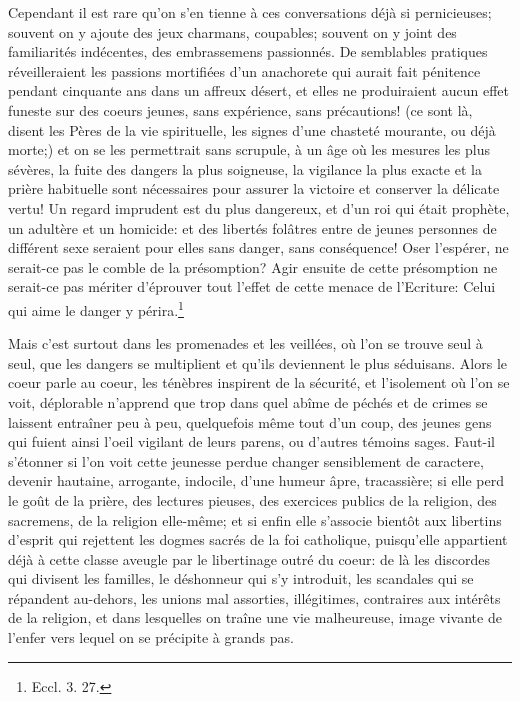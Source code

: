 \documentclass[instructions.tex]{subfiles}
\begin{document}
\secundo Cependant il est rare qu’on s’en tienne à ces conversations déjà si pernicieuses; souvent on y ajoute des jeux charmans, coupables; souvent on y joint des familiarités indécentes, des embrassemens passionnés. De semblables pratiques réveilleraient les passions mortifiées d’un anachorete qui aurait fait pénitence pendant cinquante ans dans un affreux désert, et elles ne produiraient aucun effet funeste sur des coeurs jeunes, sans expérience, sans précautions! (ce sont là, disent les Pères de la vie spirituelle, les signes d’une chasteté mourante, ou déjà morte;) et on se les permettrait sans scrupule, à un âge où les mesures les plus sévères, la fuite des dangers la plus soigneuse, la vigilance la plus exacte et la prière habituelle sont nécessaires pour assurer la victoire et conserver la délicate vertu! Un regard imprudent est du plus dangereux, et d’un roi qui était prophète, un adultère et un homicide: et des libertés folâtres entre de jeunes personnes de différent sexe seraient pour elles sans danger, sans conséquence! Oser l’espérer, ne serait-ce pas le comble de la présomption? Agir ensuite de cette présomption ne serait-ce pas mériter d’éprouver tout l’effet de cette menace de l’Ecriture: Celui qui aime le danger y périra.\footnote{Eccl. 3. 27.}

\tertio Mais c’est surtout dans les promenades et les veillées, où l’on se trouve seul à seul, que les dangers se multiplient et qu’ils deviennent le plus séduisans. Alors le coeur parle au coeur, les ténèbres inspirent de la sécurité, et l’isolement où l’on se voit, déplorable n’apprend que trop dans quel abîme de péchés et de crimes se laissent entraîner peu à peu, quelquefois même tout d’un coup, des jeunes gens qui fuient ainsi l’oeil vigilant de leurs parens, ou d’autres témoins sages. Faut-il s’étonner si l’on voit cette jeunesse perdue changer sensiblement de caractere, devenir hautaine, arrogante, indocile, d’une humeur âpre, tracassière; si elle perd le goût de la prière, des lectures pieuses, des exercices publics de la religion, des sacremens, de la religion elle-même; et si enfin elle s’associe bientôt aux libertins d’esprit qui rejettent les dogmes sacrés de la foi catholique, puisqu’elle appartient déjà à cette classe aveugle par le libertinage outré du coeur: de là les discordes qui divisent les familles, le déshonneur qui s’y introduit, les scandales qui se répandent au-dehors, les unions mal assorties, illégitimes, contraires aux intérêts de la religion, et dans lesquelles on traîne une vie malheureuse, image vivante de l’enfer vers lequel on se précipite à grands pas.
\end{document}
